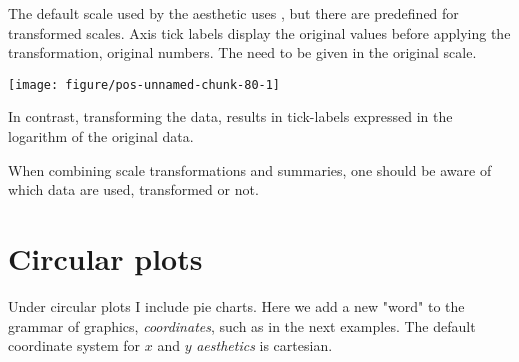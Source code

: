 \documentclass[paper=a4,10pt,div=17,headsepline,BCOR=12mm,twoside,open=right]{scrbook}\usepackage{knitr}
\begin{document}
The default scale used by the  aesthetic uses , but there are predefined for transformed scales. Axis tick labels display the original values before applying the transformation, original numbers. The  need to be given in the original scale.

\begin{knitrout}\footnotesize
{}\color{fgcolor}\begin{kframe}
\begin{alltt}
 \hlopt{+} \hlstd{(}\hlstd{=}\hlstd{(}\hlstd{,}\hlstd{,}\hlstd{,}\hlstd{))}
\end{alltt}
\end{kframe}

{\centering \texttt{[image: figure/pos-unnamed-chunk-80-1]} 

}



\end{knitrout}

In contrast, transforming the data, results in tick-labels expressed in the logarithm of the original data.

\begin{knitrout}\footnotesize
{}\color{fgcolor}\begin{kframe}
\begin{alltt}
 \hlkwb{<-}    \hlopt{+} \hlstd{()}
\end{alltt}
\end{kframe}
\end{knitrout}

When combining scale transformations and summaries, one should be aware of which data are used, transformed or not.

\section{Circular plots}

Under circular plots I include pie charts. Here we add a new "word" to the grammar of graphics, \textit{coordinates}, such as  in the next examples. The default coordinate system for $x$ and $y$ \textit{aesthetics} is cartesian.
\end{document}
